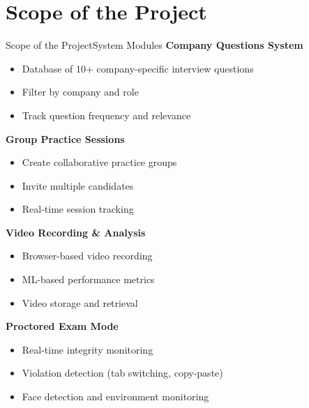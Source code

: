 \documentclass{beamer}
\begin{document}
\section{Scope of the Project}
\begin{frame}{Scope of the Project}{System Modules}
\textbf{Company Questions System}
\begin{itemize}
    \item Database of 10+ company-specific interview questions
    \item Filter by company and role
    \item Track question frequency and relevance
\end{itemize}

\textbf{Group Practice Sessions}
\begin{itemize}
    \item Create collaborative practice groups
    \item Invite multiple candidates
    \item Real-time session tracking
\end{itemize}

\textbf{Video Recording \& Analysis}
\begin{itemize}
    \item Browser-based video recording
    \item ML-based performance metrics
    \item Video storage and retrieval
\end{itemize}

\textbf{Proctored Exam Mode}
\begin{itemize}
    \item Real-time integrity monitoring
    \item Violation detection (tab switching, copy-paste)
    \item Face detection and environment monitoring
\end{itemize}
\end{frame}
\end{document}
